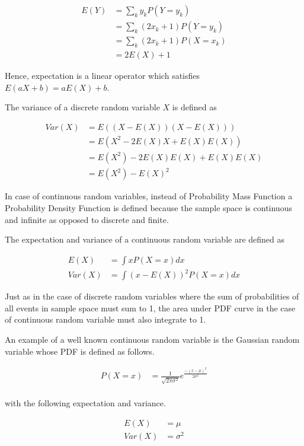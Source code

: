 \documentclass[11pt, a4paper]{article}
\begin{document}
\begin{align*}
	E(Y) & = \sum_k y_k P(Y=y_k)         \\ 
	     & = \sum_k (2 x_k + 1) P(Y=y_k) \\
	     & = \sum_k (2x_k + 1) P(X=x_k)  \\
	     & = 2E(X) + 1                   
\end{align*}

Hence, expectation is a linear operator which satisfies $E(aX + b) = aE(X) + b$.

The variance of a discrete random variable $X$ is defined as

\begin{align*}
	Var(X) & = E((X-E(X))(X-E(X)))           \\
	       & = E(X^2 - 2E(X)X + E(X)E(X))    \\
	       & = E(X^2) - 2E(X)E(X) + E(X)E(X) \\
	       & = E(X^2) - E(X)^2               
\end{align*}

In case of continuous random variables, instead of Probability Mass Function a Probability Density Function is defined because the sample space is continuous and infinite as opposed to discrete and finite.

The expectation and variance of a continuous random variable are defined as

\begin{align*}
	E(X)   & = \int x P(X=x) dx            \\
	Var(X) & = \int (x - E(X))^2 P(X=x) dx 
\end{align*}

Just as in the case of discrete random variables where the sum of probabilities of all events in sample space must sum to 1, the area under PDF curve in the case of continuous random variable must also integrate to 1.

An example of a well known continuous random variable is the Gaussian random variable whose PDF is defined as follows.

\begin{align*}
	P(X=x) & = \frac{1}{\sqrt{2\pi\sigma^2}} e^{\frac{-(x-\mu)^2}{2\sigma^2}} \\
\end{align*}

with the following expectation and variance.

\begin{align*}
	E(X)   & = \mu      \\
	Var(X) & = \sigma^2 
\end{align*}
\end{document}
